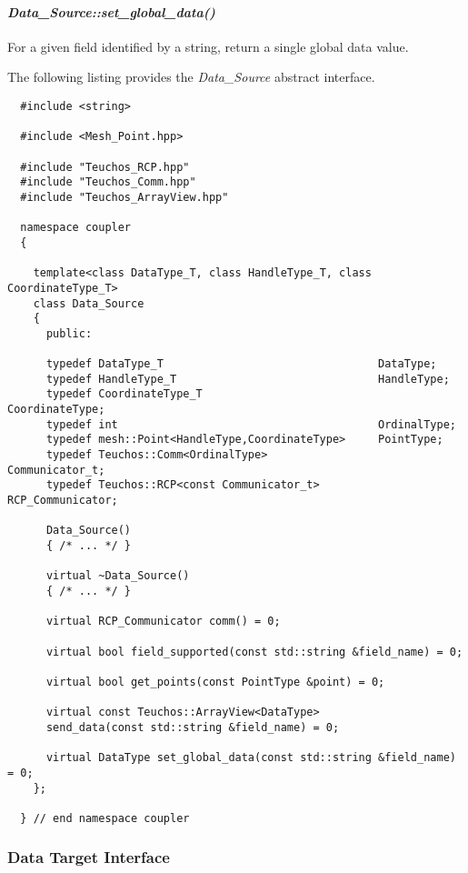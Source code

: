 \documentclass[letterpaper]{article}
\begin{document}
\paragraph{\sl Data\_Source::set\_global\_data()}
For a given field identified by a string, return a single global data
value.

The following listing provides the {\sl Data\_Source} abstract
interface. 

\begin{lstlisting}
  #include <string>

  #include <Mesh_Point.hpp>

  #include "Teuchos_RCP.hpp"
  #include "Teuchos_Comm.hpp" 
  #include "Teuchos_ArrayView.hpp"

  namespace coupler
  {

    template<class DataType_T, class HandleType_T, class CoordinateType_T>
    class Data_Source 
    {
      public:

      typedef DataType_T                                 DataType;
      typedef HandleType_T                               HandleType;
      typedef CoordinateType_T                           CoordinateType;
      typedef int                                        OrdinalType;
      typedef mesh::Point<HandleType,CoordinateType>     PointType;
      typedef Teuchos::Comm<OrdinalType>                 Communicator_t;
      typedef Teuchos::RCP<const Communicator_t>         RCP_Communicator;

      Data_Source()
      { /* ... */ }

      virtual ~Data_Source()
      { /* ... */ }

      virtual RCP_Communicator comm() = 0;

      virtual bool field_supported(const std::string &field_name) = 0;

      virtual bool get_points(const PointType &point) = 0;

      virtual const Teuchos::ArrayView<DataType> 
      send_data(const std::string &field_name) = 0;

      virtual DataType set_global_data(const std::string &field_name) = 0;
    };

  } // end namespace coupler
\end{lstlisting}

\subsubsection{Data Target Interface}
\end{document}
